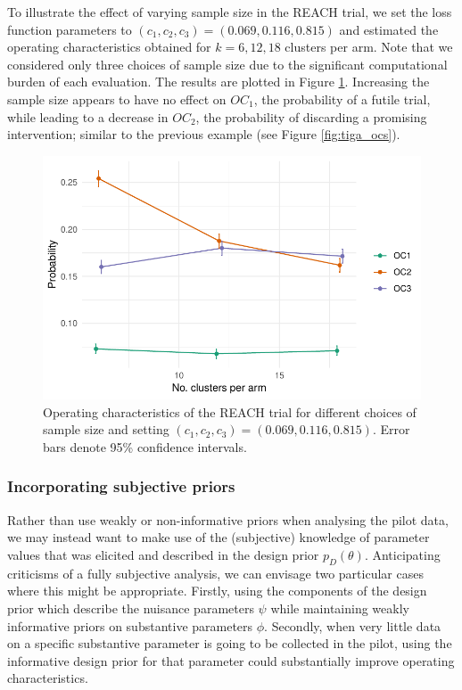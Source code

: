 \documentclass[AMA,STIX1COL]{WileyNJD-v2}
\begin{document}
To illustrate the effect of varying sample size in the REACH trial, we set the loss function parameters to $(c_1, c_2, c_3) = (0.069, 0.116, 0.815)$ and estimated the operating characteristics obtained for $k = 6, 12, 18$ clusters per arm. Note that we considered only three choices of sample size due to the significant computational burden of each evaluation. The results are plotted in Figure \ref{fig:k_comp}. Increasing the sample size appears to have no effect on $OC_1$, the probability of a futile trial, while leading to a decrease in $OC_2$, the probability of discarding a promising intervention; similar to the previous example (see Figure \ref{fig:tiga_ocs}).

\begin{figure}
\centering
\includegraphics[scale=0.8]{./figures/k_comp}
\caption{Operating characteristics of the REACH trial for different choices of sample size and setting $(c_1, c_2, c_3) = (0.069, 0.116, 0.815)$. Error bars denote 95\% confidence intervals.}
\label{fig:k_comp}
\end{figure}

\subsubsection{Incorporating subjective priors}

Rather than use weakly or non-informative priors when analysing the pilot data, we may instead want to make use of the (subjective) knowledge of parameter values that was elicited and described in the design prior $p_D(\theta)$. Anticipating criticisms of a fully subjective analysis, we can envisage two particular cases where this might be appropriate. Firstly, using the components of the design prior which describe the nuisance parameters $\psi$ while maintaining weakly informative priors on substantive parameters $\phi$. Secondly, when very little data on a specific substantive parameter is going to be collected in the pilot, using the informative design prior for that parameter could substantially improve operating characteristics.
\end{document}
